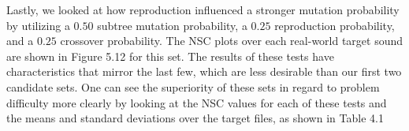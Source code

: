 \documentclass[a4paper,12pt]{report} 	%
\numberwithin{figure}{chapter}
\numberwithin{table}{chapter}
\numberwithin{equation}{chapter}
\begin{document}
\begin{flushleft}
Lastly, we looked at how reproduction influenced a stronger mutation probability by utilizing a $0.50$ subtree mutation probability, a $0.25$ reproduction probability, and a $0.25$ crossover probability. The NSC plots over each real-world target sound are shown in Figure 5.12 for this set.
The results of these tests have characteristics that mirror the last few, which are less desirable than our first two candidate sets. One can see the superiority of these sets in regard to problem difficulty more clearly by looking at the NSC values for each of these tests and the means and standard deviations over the target files, as shown in Table 4.1

\end{flushleft}
\end{document}
